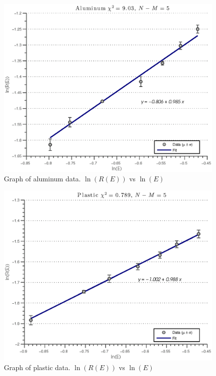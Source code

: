 \begin{figure}[htbp]
  \centering
\includegraphics[width=\MyWidth]{Figures/linearAluminumGraph.eps}
  \caption{Graph of aluminum data. $\ln(R(E))$ vs $\ln(E)$}
  \label{fig:Figures_linearAluminumGraph}
\end{figure}%

\begin{figure}[htbp]
  \centering
\includegraphics[width=\MyWidth]{Figures/linearPlasticGraph.eps}
  \caption{Graph of plastic data. $\ln(R(E))$ vs $\ln(E)$}
  \label{fig:Figures_linearPlasticGraph}
\end{figure}%


